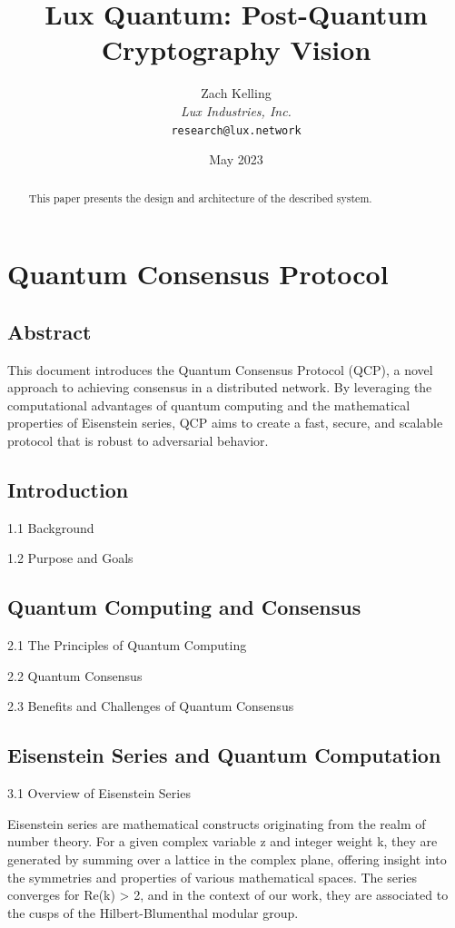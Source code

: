 \documentclass[11pt]{article}
\title{Lux Quantum: Post-Quantum Cryptography Vision}
\author{Zach Kelling\\\textit{Lux Industries, Inc.}\\\texttt{research@lux.network}}
\date{May 2023}
\begin{document}
\luxcoverpage

\begin{abstract}
This paper presents the design and architecture of the described system.
\end{abstract}

\tableofcontents
\newpage


\section{Quantum Consensus Protocol}

\subsection{Abstract}

This document introduces the Quantum Consensus Protocol (QCP), a novel approach to achieving consensus in a distributed network. By leveraging the computational advantages of quantum computing and the mathematical properties of Eisenstein series, QCP aims to create a fast, secure, and scalable protocol that is robust to adversarial behavior.


\subsection{Introduction}

1.1 Background


1.2 Purpose and Goals


\subsection{Quantum Computing and Consensus}

2.1 The Principles of Quantum Computing


2.2 Quantum Consensus


2.3 Benefits and Challenges of Quantum Consensus


\subsection{Eisenstein Series and Quantum Computation}

3.1 Overview of Eisenstein Series


Eisenstein series are mathematical constructs originating from the realm of number theory. For a given complex variable z and integer weight k, they are generated by summing over a lattice in the complex plane, offering insight into the symmetries and properties of various mathematical spaces. The series converges for Re(k) > 2, and in the context of our work, they are associated to the cusps of the Hilbert-Blumenthal modular group.
\end{document}
